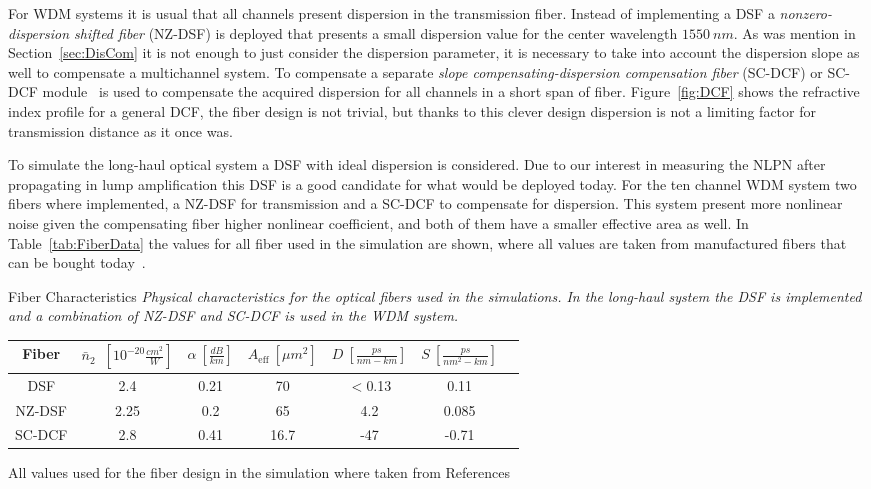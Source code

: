 For WDM systems it is usual that all channels present dispersion in the transmission fiber. Instead of implementing a DSF a \textit{nonzero-dispersion shifted fiber} (NZ-DSF) is deployed that presents a small dispersion value for the center wavelength $1550~nm$. As was mention in Section~\ref{sec:DisCom} it is not enough to just consider the dispersion parameter, it is necessary to take into account the dispersion slope as well to compensate a multichannel system. To compensate a separate \textit{slope compensating-dispersion compensation fiber} (SC-DCF) or SC-DCF module~\cite{aikawa2005dispersion} is used to compensate the acquired dispersion for all channels in a short span of fiber. Figure~\ref{fig:DCF} shows the refractive index profile for a general DCF, the fiber design is not trivial, but thanks to this clever design dispersion is not a limiting factor for transmission distance as it once was.

To simulate the long-haul optical system a DSF with ideal dispersion is considered. Due to our interest in measuring the NLPN after propagating in lump amplification this DSF is a good candidate for what would be deployed today. For the ten channel WDM system two fibers where implemented, a NZ-DSF for transmission and a SC-DCF to compensate for dispersion. This system present more nonlinear noise given the compensating fiber higher nonlinear coefficient, and both of them have a smaller effective area as well. In  Table~\ref{tab:FiberData} the values for all fiber used in the simulation are shown, where all values are taken from manufactured fibers that can be bought today~\cite{namihira2002comparison,onishi1997highly}.
  






\begin{mytable}[float=t, label=tab:FiberData]{  Fiber Characteristics}
\emph{Physical characteristics for the optical fibers used in the simulations. In the long-haul system the DSF is implemented and a combination of NZ-DSF and SC-DCF is used in the WDM system. }

\begin{center}
\begin{tabular}{c|cccccc} 
\toprule
Fiber& $\bar{n}_{2}$~$[10^{-20}\frac{cm^2}{W}]$ & $\alpha~[\frac{dB}{km}]$ & $A_{\text{eff}}~[\mu m^2] $  & $D~[\frac{ps}{nm-km}]$ & $S~[\frac{ps}{nm^2-km}]$   \\ 
\midrule
DSF & 2.4 & 0.21 & 70 & $<$0.13 & 0.11  \\ 
\midrule
NZ-DSF & 2.25 & 0.2 & 65 & 4.2 & 0.085  \\ 
\midrule
SC-DCF & 2.8 & 0.41 & 16.7 & -47 & -0.71  \\ 
\bottomrule
\end{tabular} 
\end{center}
All values used for the fiber design in the simulation where taken from References~\cite{kato2000dispersion,kim1994measurement,aikawa2005dispersion,namihira2002comparison} 
\end{mytable}
